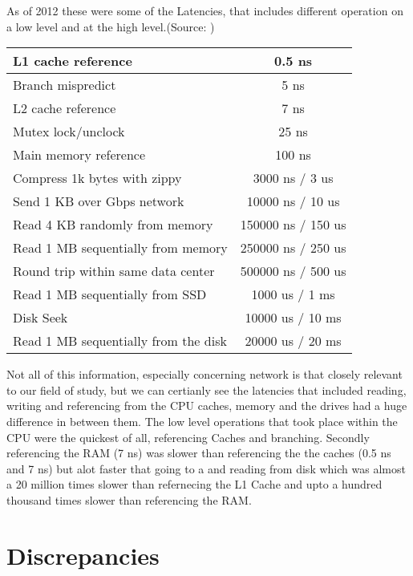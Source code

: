 \documentclass[12pt]{article}
\begin{document}
As of 2012 these were some of the Latencies, that includes different operation on a low level
and at the high level.(Source: \cite {Latencies})

\begin{tabular}{|l|c|}
  \hline
  L1 cache reference & 0.5 ns\\
  \hline
  Branch mispredict & 5 ns\\
  \hline
  L2 cache reference & 7 ns\\
  \hline
  Mutex lock/unclock & 25 ns\\
  \hline
  Main memory reference & 100 ns\\
  \hline
  Compress 1k bytes with zippy & 3000 ns / 3 us\\
  \hline
  Send 1 KB over Gbps network & 10000 ns / 10 us\\
  \hline
  Read 4 KB randomly from memory & 150000 ns / 150 us\\
  \hline
  Read 1 MB sequentially from memory & 250000 ns / 250 us\\
  \hline
  Round trip within same data center & 500000 ns / 500 us\\
  \hline
  Read 1 MB sequentially from SSD & 1000 us / 1 ms\\
  \hline
  Disk Seek & 10000 us / 10 ms\\
  \hline
  Read 1 MB sequentially from the disk & 20000 us / 20 ms\\ 
  \hline    
\end {tabular}

Not all of this information, especially concerning network is that closely relevant to our field of study, but
we can certianly see the latencies that included reading, writing and referencing from the CPU caches, memory
and the drives had a huge difference in between them. The low level operations that took place within the
CPU were the quickest of all, referencing Caches and branching. Secondly referencing the RAM (7 ns) was slower than
referencing the the caches (0.5 ns and 7 ns) but alot faster that going to a and reading from disk which was almost a
20 million times slower than refernecing the L1 Cache and upto a hundred thousand times slower than referencing
the RAM. 

\section{Discrepancies}
\label{sec:disc}
\end{document}
